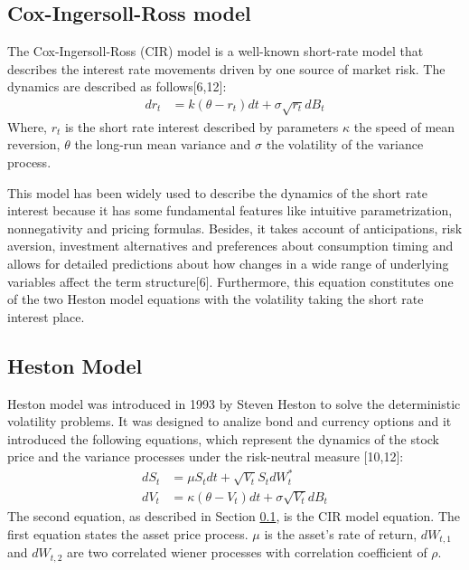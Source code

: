 \documentclass[12pt,twoside]{reedthesis}
\theoremstyle{definition}
\theoremstyle{definition}
\theoremstyle{remark}
\begin{document}
  \subsection{Cox-Ingersoll-Ross model}\label{cir}
  
  The Cox-Ingersoll-Ross (CIR) model is a well-known short-rate model that
  describes the interest rate movements driven by one source of market
  risk. The dynamics are described as follows{[}6,12{]}:
  \begin{align}
  \label{eq:cir}
  dr_t &= k(\theta - r_t)dt + \sigma \sqrt{r_t} dB_t
  \end{align}
  \noindent
  Where, \(r_t\) is the short rate interest described by parameters
  \(\kappa\) the speed of mean reversion, \(\theta\) the long-run mean
  variance and \(\sigma\) the volatility of the variance process.
  
  This model has been widely used to describe the dynamics of the short
  rate interest because it has some fundamental features like intuitive
  parametrization, nonnegativity and pricing formulas. Besides, it takes
  account of anticipations, risk aversion, investment alternatives and
  preferences about consumption timing and allows for detailed predictions
  about how changes in a wide range of underlying variables affect the
  term structure{[}6{]}. Furthermore, this equation constitutes one of the
  two Heston model equations with the volatility taking the short rate
  interest place.
  
  \subsection{Heston Model}\label{hes1}
  
  Heston model was introduced in 1993 by Steven Heston to solve the
  deterministic volatility problems. It was designed to analize bond and
  currency options and it introduced the following equations, which
  represent the dynamics of the stock price and the variance processes
  under the risk-neutral measure {[}10,12{]}:
  \begin{align}
  \label{eq:heston}
  dS_t &= \mu S_t dt + \sqrt{V_t} S_t dW^*_t \\
  dV_t &=  \kappa (\theta - V_t)dt + \sigma \sqrt{V_t} dB_t
  \label{eq:hesvar}
  \end{align}
  The second equation, as described in Section \ref{cir}, is the CIR model
  equation. The first equation states the asset price process. \(\mu\) is
  the asset's rate of return, \(dW_{t,1}\) and \(dW_{t,2}\) are two
  correlated wiener processes with correlation coefficient of \(\rho\).
  
\end{document}
